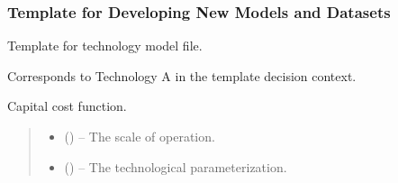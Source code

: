 \documentclass[letterpaper,10pt,english]{sphinxmanual}
\begin{document}
\subsubsection{Template for Developing New Models and Datasets}
\label{\detokenize{technology:module-technology.technology_a_model}}\label{\detokenize{technology:template-for-developing-new-models-and-datasets}}
\sphinxAtStartPar
Template for technology model file.

\sphinxAtStartPar
Corresponds to Technology A in the template decision context.

\begin{fulllineitems}
\label{\detokenize{technology:technology.technology_a_model.capital_cost}}
\pysigstartsignatures
{}
\pysigstopsignatures
\sphinxAtStartPar
Capital cost function.
\begin{quote}\begin{description}
\begin{itemize}
\item {} 
\sphinxAtStartPar
{} () – The scale of operation.

\item {} 
\sphinxAtStartPar
{} () – The technological parameterization.

\end{itemize}

\end{description}\end{quote}

\end{fulllineitems}

\end{document}
